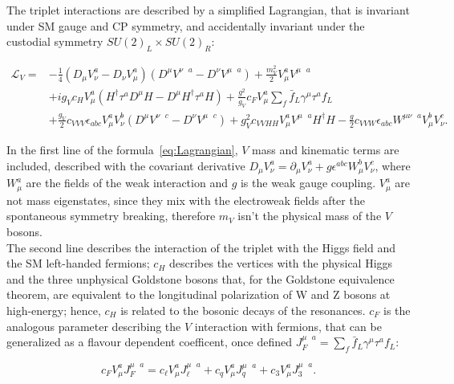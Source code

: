 \noindent The triplet interactions are described by a simplified Lagrangian, that is invariant under SM gauge and CP symmetry, and accidentally invariant under the custodial symmetry $SU(2)_L \times SU(2)_R$:

\begin{equation}
\begin{split}
\mathcal{L}_{V} ={} & -\frac{1}{4} \left(D_{\mu}V_{\nu}^a - D_{\nu}V_{\mu}^a \right) \left( D^{\mu}V^{\nu \mbox{ } a} - D^{\nu}V^{\mu \mbox{ } a} \right) + \frac{m_V^2}{2}V_{\mu}^aV^{\mu \mbox{ } a} \\
 & +i g_V c_H V_{\mu}^a \left( H^{\dagger} \tau^a D^{\mu}H - D^{\mu}H^{\dagger} \tau^a H \right) + \frac{g^2}{g_V}c_F V_{\mu}^a \sum_{f} \bar{f}_L \gamma^{\mu} \tau^a f_L \\
 & + \frac{g_V}{2} c_{VVV} \epsilon_{abc} V_{\mu}^a V_{\nu}^b \left( D^{\mu}V^{\nu \mbox{ } c} - D^{\nu}V^{\mu \mbox{ } c}\right) + g_V^2 c_{VVHH} V_{\mu}^a V^{\mu \mbox{ } a} H^{\dagger} H - \frac{g}{2} c_{VVW} \epsilon_{abc} W^{\mu \nu \mbox{ } a} V_{\mu}^b V_{\nu}^c.
\end{split}
\label{eq:Lagrangian}
\end{equation}

\noindent In the first line of the formula~\ref{eq:Lagrangian}, $V$ mass and kinematic terms are included, described with the covariant derivative $D_{\mu} V_{\nu}^a = \partial_{\mu} V_{\nu}^a + g \epsilon^{abc} W_{\mu}^b V_{\nu}^c$, where $W_{\mu}^a$ are the fields of the weak interaction and $g$ is the weak gauge coupling. $V_{\mu}^a$ are not mass eigenstates, since they mix with the electroweak fields after the spontaneous symmetry breaking, therefore $m_V$ isn't the physical mass of the $V$ bosons.\\
The second line describes the interaction of the triplet with the Higgs field and the SM left-handed fermions; $c_H$ describes the vertices with the physical Higgs and the three unphysical Goldstone bosons that, for the Goldstone equivalence theorem, are equivalent to the longitudinal polarization of W and Z bosons at high-energy; hence, $c_H$ is related to the bosonic decays of the resonances. $c_F$ is the analogous parameter describing the $V$ interaction with fermions, that can be generalized as a flavour dependent coefficent, once defined $J_F^{\mu \mbox{ } a} = \sum_{f} \bar{f}_L \gamma^{\mu} \tau^a f_L$:

\begin{equation}
c_F V_{\mu}^a  J_F^{\mu \mbox{ } a} = c_{\ell} V_{\mu}^a  J_{\ell}^{\mu \mbox{ } a} + c_{q} V_{\mu}^a  J_{q}^{\mu \mbox{ } a} + c_{3} V_{\mu}^a  J_{3}^{\mu \mbox{ } a}.
\end{equation}

